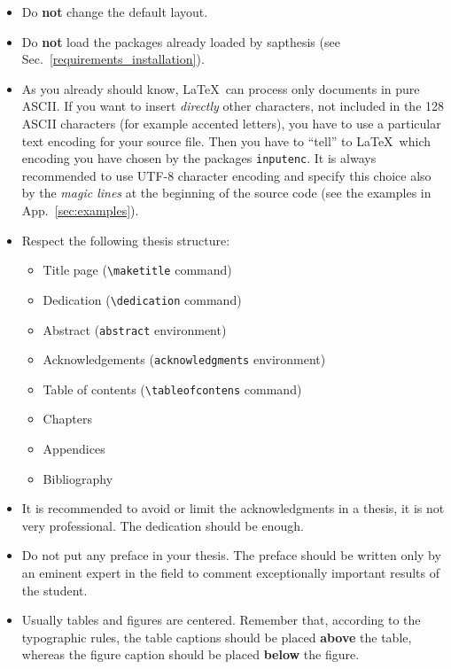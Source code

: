 \documentclass[a5paper,12pt]{article}
\newcommand{\bs}{\textbackslash}
\begin{document}
\begin{itemize}

\item Do \textbf{not} change the default layout.

\item Do \textbf{not} load the packages already loaded by \textsf{sapthesis} (see Sec.~\ref{requirements_installation}).

\item As you already should know, \LaTeX\ can process only documents
in pure ASCII. If you want to insert \emph{directly} other characters, not included in the 128 ASCII characters (for example accented letters), you have to use a particular text encoding for your source file. Then you have to ``tell'' to \LaTeX\ which encoding you have chosen by the packages \texttt{inputenc}. It is always recommended to use UTF-8 character encoding and specify this choice also by the \emph{magic lines} at the beginning of the source code (see the examples in App.~\ref{sec:examples}).

\item Respect the following thesis structure:

\begin{itemize}
\item Title page (\texttt{\bs maketitle} command)
\item Dedication (\texttt{\bs dedication} command)
\item Abstract (\texttt{abstract} environment)
\item Acknowledgements (\texttt{acknowledgments} environment)
\item Table of contents (\texttt{\bs tableofcontens} command)
\item Chapters
\item Appendices
\item Bibliography
\end{itemize}

\item It is recommended to avoid or limit the acknowledgments in a thesis, it 
is not very professional. The dedication should be enough.

\item Do not put any preface in your thesis. The preface should be written only by an eminent expert in the field to comment exceptionally important results of the student.

\item Usually tables and figures are centered. Remember that, according to the typographic rules, the table captions should be placed \textbf{above} the table, whereas the figure caption should be placed \textbf{below} the figure.


\end{itemize}
\end{document}
